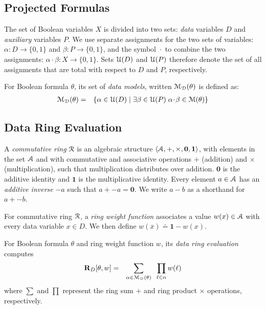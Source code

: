 \documentclass[letterpaper,USenglish,cleveref, autoref, thm-restate]{lipics-v2021}
\newcommand{\obar}[1]{\overline{#1}}
\newcommand{\lit}{\ell}
\newcommand{\dvarset}{D}
\newcommand{\varset}{X}
\newcommand{\pvarset}{P}
\newcommand{\ring}{{\cal R}}
\newcommand{\dset}{{\cal A}}
\newcommand{\drep}{\textbf{R}_D}
\newcommand{\radd}{+}
\newcommand{\rmul}{\times}
\newcommand{\addident}{\textbf{0}}
\newcommand{\mulident}{\textbf{1}}
\newcommand{\uassign}{{\cal U}}
\newcommand{\modelset}{{\cal M}}
\newcommand{\dassign}{\alpha}
\newcommand{\passign}{\beta}
\newcommand{\acombine}{\!\cdot\!}
\newcommand{\dmodelset}{{\cal M_{D}}}
\begin{document}
\subsection{Projected Formulas}

The set of Boolean variables $\varset$ is divided into two sets: {\em data} variables
$\dvarset$ and {\em auxiliary} variables $\pvarset$.  We use separate
assignments for the two sets of variables:
$\dassign \colon \dvarset \rightarrow \{0,1\}$
 and
 $\passign \colon \pvarset \rightarrow \{0,1\}$, and the symbol $\acombine$ to combine the two assignments:
 $\dassign\acombine\passign \colon \varset \rightarrow \{0,1\}$.
Sets $\uassign(\dvarset)$ and $\uassign(\pvarset)$ therefore denote the set of all assignments that are total with respect to $\dvarset$ and $\pvarset$, respectively.

For Boolean formula $\theta$,
its set of {\em data models}, written $\dmodelset(\theta)$ is defined as:
\begin{eqnarray}
\dmodelset(\theta) & = & \{ \dassign \in \uassign(\dvarset) \mid  \exists \passign \in \uassign(\pvarset) \; \dassign\acombine\passign \in \modelset(\theta) \} \label{eqn:dmodelset}
\end{eqnarray}

\subsection{Data Ring Evaluation}

  A \emph{commutative ring} $\ring$ is an algebraic structure
  $\langle \dset, \radd, \rmul, \addident, \mulident \rangle$,
  with elements in the set $\dset$ and with commutative and
  associative operations $\radd$ (addition) and $\rmul$ (multiplication),
  such that multiplication distributes
  over addition.  $\addident$ is the additive identity and $\mulident$ is
  the multiplicative identity.  Every element $a \in \dset$ has an
  \emph{additive inverse} $-a$ such that $a + -a = \addident$.
We write $a - b$ as a shorthand for $a + -b$.

  For commutative ring $\ring$, a {\em ring weight function} associates a value $w(x) \in \dset$ with
  every data variable $x \in \dvarset$.  We then define $w(\obar{x}) \doteq \mulident-w(x)$.

  For Boolean formula $\theta$ and ring weight function $w$, its {\em data ring evaluation} computes
  \begin{eqnarray}
    \drep[\theta, w] & = & \sum_{\alpha \in \dmodelset(\theta)} \;\; \prod_{\lit \in \alpha} w(\lit) \label{eqn:rep}
  \end{eqnarray}
where $\sum$ and $\prod$ represent the ring sum $\radd$ and ring product $\rmul$ operations, respectively.
\end{document}
